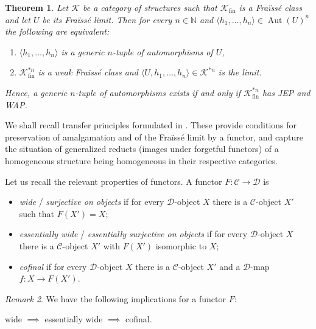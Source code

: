 \documentclass[10pt,a4paper]{article}
\newtheorem{tw}{Theorem}[section]
\theoremstyle{definition}
\theoremstyle{remark}
\newtheorem{uwgi}[tw]{Remark}
\newcommand \seq [1]{\langle #1 \rangle}
\newcommand \maps {\colon} %
\newcommand \N {\mathbb{N}}
\newcommand \C {\mathscr{C}}
\newcommand \D {\mathscr{D}}
\newcommand \K {\mathscr{K}}
\newcommand \fin {{\operatorname{fin}}}
\newcommand \Aut {\operatorname{Aut}}
\begin{document}
\begin{tw} \label{thm:KR}
    Let $\K$  be a category of structures such that $\K_\fin$ is a Fraïssé class and let $U$ be its Fraïssé limit.
    Then for every $n \in \N$ and $\seq{h_1, \ldots, h_n} \in \Aut(U)^n$ the following are equivalent:
    \begin{enumerate}
        \item $\seq{h_1, \ldots, h_n}$ is a generic $n$-tuple of automorphisms of $U$,
        \item $\K_\fin^{*n}$ is a weak Fraïssé class and $\seq{U, h_1, \ldots, h_n} \in \K^{*n}$ is the limit.
    \end{enumerate}
    Hence, a generic $n$-tuple of automorphisms exists if and only if $\K_\fin^{*n}$ has JEP and WAP.
\end{tw}






We shall recall transfer principles formulated in \cite[Section~3.1]{paper1}.
These provide conditions for preservation of amalgamation and of the Fraïssé limit by a functor, and capture the situation of generalized reducts (images under forgetful functors) of a homogeneous structure being homogeneous in their respective categories.

Let us recall the relevant properties of functors.
A functor $F\maps \C \to \D$ is


\begin{itemize}
    \item {\it wide} / {\it surjective on objects} if for every $\D$-object $X$ there is a $\C$-object $X'$ such that $F(X')=X$;
    
    \item {\it essentially wide} / {\it essentially surjective on objects} if for every $\D$-object $X$ there is a $\C$-object $X'$ with $F(X') $ isomorphic to $ X$;
    
	\item {\it cofinal} if for every $\D$-object $X$ there is a $\C$-object $X'$ and a $\D$-map $f\maps X \to F(X')$.
\end{itemize}

\begin{uwgi}
We have the following implications for a functor $F$:

\smallskip
\centerline{wide $\implies$ essentially wide $\implies$ cofinal.}
\end{uwgi}
\end{document}
